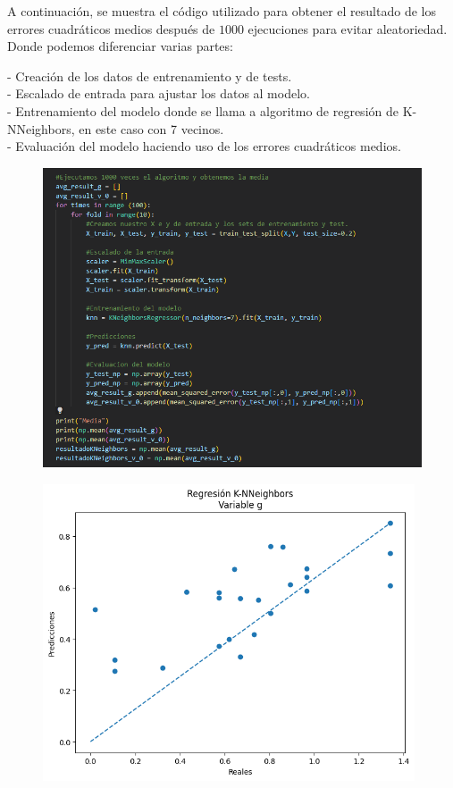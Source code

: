 \documentclass[oneside,openright,titlepage,numbers=noenddot,openany,headinclude,footinclude=true,
cleardoublepage=empty,abstractoff,BCOR=5mm,paper=a4,fontsize=12pt,main=spanish]{scrreprt}
\begin{document}
A continuación, se muestra el código utilizado para obtener el resultado de los errores cuadráticos medios después de $1000$ ejecuciones para evitar aleatoriedad. Donde podemos diferenciar varias partes:

- Creación de los datos de entrenamiento y de tests.\\
- Escalado de entrada para ajustar los datos al modelo.\\
- Entrenamiento del modelo donde se llama a algoritmo de regresión de K-NNeighbors, en este caso con 7 vecinos.\\
- Evaluación del modelo haciendo uso de los errores cuadráticos medios.

\begin{figure}[H]
	\centering
	\includegraphics[width=15cm]{Código de K-NNeighbors.png}
\end{figure}

\begin{figure}[H]
	\centering
	\includegraphics[width=11cm]{Regresión K-NNeighbors Variable g.png}
\end{figure}
\end{document}
